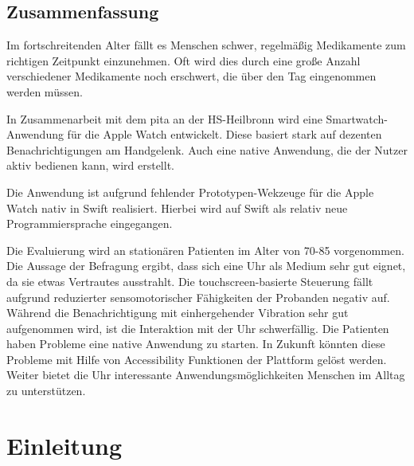 \documentclass[
	12pt,
	BCOR=10mm,
	listof=totoc,
	bibliography=totoc
	]
{scrbook} %
\begin{document}

\begin{titlepage}
	
\end{titlepage} 

\frontmatter
\section*{Zusammenfassung}


Im fortschreitenden Alter fällt es Menschen schwer, regelmäßig Medikamente zum richtigen Zeitpunkt einzunehmen. Oft wird dies durch eine große Anzahl verschiedener Medikamente noch erschwert, die über den Tag eingenommen werden müssen. 

In Zusammenarbeit mit dem \gls{pita} an der HS-Heilbronn wird eine Smartwatch-Anwendung für die Apple Watch entwickelt. Diese basiert stark auf dezenten Benachrichtigungen am Handgelenk. Auch eine native Anwendung, die der Nutzer aktiv bedienen kann, wird erstellt.

Die Anwendung ist aufgrund fehlender Prototypen-Wekzeuge für die Apple Watch nativ in Swift realisiert. Hierbei wird auf Swift als relativ neue Programmiersprache eingegangen.

Die Evaluierung wird an stationären Patienten im Alter von 70-85 vorgenommen. Die Aussage der Befragung ergibt, dass sich eine Uhr als Medium sehr gut eignet, da sie etwas Vertrautes ausstrahlt. Die touchscreen-basierte Steuerung fällt aufgrund reduzierter sensomotorischer Fähigkeiten der Probanden negativ auf. Während die Benachrichtigung mit einhergehender Vibration sehr gut aufgenommen wird, ist die Interaktion mit der Uhr schwerfällig. Die Patienten haben Probleme eine native Anwendung zu starten. In Zukunft könnten diese Probleme mit Hilfe von Accessibility Funktionen der Plattform gelöst werden. Weiter bietet die Uhr interessante Anwendungsmöglichkeiten Menschen im Alltag zu unterstützen.

\tableofcontents

\listoffigures

\listoftables


\twocolumn
\printglossaries

\onecolumn
\mainmatter
\chapter{Einleitung}
\label{ch:introduction}
 	
  
\end{document}
